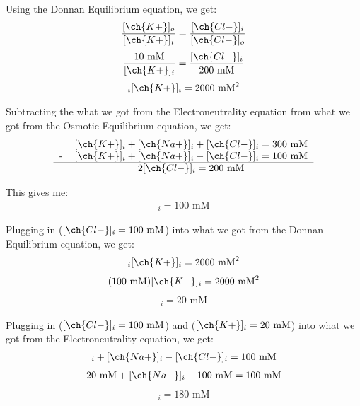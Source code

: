\documentclass[11pt]{article}
\begin{document}
\begin{enumerate}[label=\arabic*.]
Using the Donnan Equilibrium equation, we get:
\begin{align*}
\frac{[\ch{K+}]_o} {[\ch{K+}]_i} = \frac{[\ch{Cl-}]_i} {[\ch{Cl-}]_o}
\end{align*}
\begin{align*}
\frac{10 \text{ mM}} {[\ch{K+}]_i} = \frac{[\ch{Cl-}]_i} {200 \text{ mM}}
\end{align*}
\begin{align*}
[\ch{Cl-}]_i [\ch{K+}]_i = 2000 \text{ mM}^2
\end{align*}

Subtracting the what we got from the Electroneutrality equation from what we got from the Osmotic Equilibrium equation, we get:
\begin{align*}
\begin{tabular}{cc}
  & $[\ch{K+}]_i + [\ch{Na+}]_i + [\ch{Cl-}]_i = 300 \text{ mM}$ \\
- & $[\ch{K+}]_i + [\ch{Na+}]_i - [\ch{Cl-}]_i= 100 \text{ mM}$ \\
\hline
  & $2[\ch{Cl-}]_i = 200 \text{ mM}$ \\
\end{tabular}
\end{align*}

This gives me:
\begin{align*}
[\ch{Cl-}]_i = 100 \text{ mM}
\end{align*}

Plugging in ($[\ch{Cl-}]_i = 100 \text{ mM}$) into what we got from the Donnan Equilibrium equation, we get:
\begin{align*}
[\ch{Cl-}]_i [\ch{K+}]_i = 2000 \text{ mM}^2
\end{align*}
\begin{align*}
(100 \text{ mM}) [\ch{K+}]_i = 2000 \text{ mM}^2
\end{align*}
\begin{align*}
[\ch{K+}]_i = 20 \text{ mM}
\end{align*}

Plugging in ($[\ch{Cl-}]_i = 100 \text{ mM}$) and ($[\ch{K+}]_i = 20 \text{ mM}$) into what we got from the Electroneutrality equation, we get:
\begin{align*}
[\ch{K+}]_i + [\ch{Na+}]_i - [\ch{Cl-}]_i= 100 \text{ mM}
\end{align*}
\begin{align*}
20 \text{ mM} + [\ch{Na+}]_i - 100 \text{ mM}= 100 \text{ mM}
\end{align*}
\begin{align*}
[\ch{Na+}]_i= 180 \text{ mM}
\end{align*}


\end{enumerate}
\end{document}
